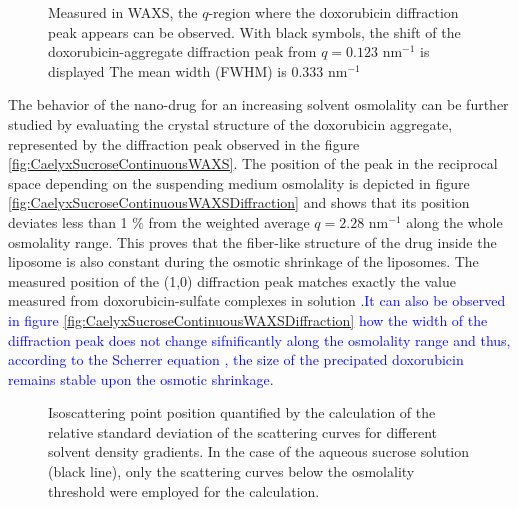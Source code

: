 \begin{figure}
	\centering
		\caption{Measured in WAXS, the $q$-region where the doxorubicin diffraction peak appears can be observed. With black symbols, the shift of the doxorubicin-aggregate diffraction peak from $q=0.123$ nm$^{-1}$ is displayed The mean width (FWHM) is 0.333  nm$^{-1}$}
\end{figure}

The behavior of the nano-drug for an increasing solvent osmolality can be further studied by evaluating the crystal structure of the doxorubicin aggregate, represented by the diffraction peak observed in the figure \ref{fig:CaelyxSucroseContinuousWAXS}. The position of the peak in the reciprocal space depending on the suspending medium osmolality is depicted in figure \ref{fig:CaelyxSucroseContinuousWAXSDiffraction} and shows that its position deviates less than 1 $\%$ from the weighted average $q=2.28$ nm$^{-1}$ along the whole osmolality range. This proves that the fiber-like structure of the drug inside the liposome is also constant during the osmotic shrinkage of the liposomes. The measured position of the (1,0) diffraction peak matches exactly the value measured from doxorubicin-sulfate complexes in solution \cite{lasic_gelation_1992}.\textcolor{blue}{It can also be observed in figure \ref{fig:CaelyxSucroseContinuousWAXSDiffraction} how the width of the diffraction peak does not change sifnificantly along the osmolality range and thus, according to the Scherrer equation \cite{cullity_elements_2001}, the size of the precipated doxorubicin remains stable upon the osmotic shrinkage.}

\begin{figure}
	\centering
		
		\caption{Isoscattering point position quantified by the calculation of the relative standard deviation of the scattering curves for different solvent density gradients. In the case of the aqueous sucrose solution (black line), only the scattering curves below the osmolality threshold were employed for the calculation.}
		\label{fig:CaelyxIsopointComparison}
\end{figure}

